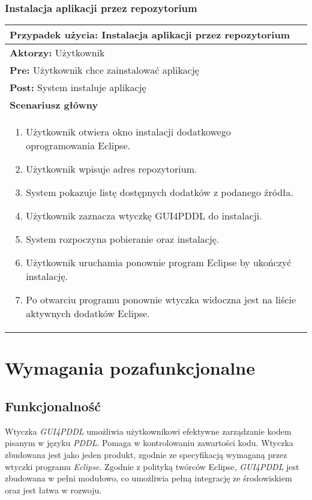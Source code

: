 \subsubsection{Instalacja aplikacji przez repozytorium}
\label{reqAutocompletion}
\begin{table}[H]
\centering
\begin{tabular}{|p{\textwidth}|}
\hline 
\textbf{Przypadek użycia:} Instalacja aplikacji przez repozytorium\\
\hline
\textbf{Aktorzy:} Użytkownik\\
\hline
\textbf{Pre:} Użytkownik chce zainstalować aplikację\\
\hline
\textbf{Post:} System instaluje aplikację\\
\hline
\textbf{Scenariusz główny}\\
\hline
\begin{enumerate}
\item Użytkownik otwiera okno instalacji dodatkowego oprogramowania Eclipse.
\item Użytkownik wpisuje adres repozytorium.
\item System pokazuje listę dostępnych dodatków z podanego źródła.
\item Użytkownik zaznacza wtyczkę GUI4PDDL do instalacji.
\item System rozpoczyna pobieranie oraz instalację.
\item Użytkownik uruchamia ponownie program Eclipse by ukończyć instalację.
\item Po otwarciu programu ponownie wtyczka widoczna jest na liście aktywnych dodatków Eclipse.
\end{enumerate}\\
\hline
\end{tabular}
\end{table}
\section{Wymagania pozafunkcjonalne}
\subsection*{Funkcjonalność}
Wtyczka \emph{GUI4PDDL} umożliwia użytkownikowi efektywne zarządzanie kodem pisanym w języku \emph{PDDL}. Pomaga w kontrolowaniu zawartości kodu. Wtyczka zbudowana jest jako jeden produkt, zgodnie ze specyfikacją wymaganą przez wtyczki programu \emph{Eclipse}. Zgodnie z polityką twórców Eclipse, \emph{GUI4PDDL} jest zbudowana w pełni modułowo, co umożliwia pełną integrację ze środowiskiem oraz jest łatwa w rozwoju.
